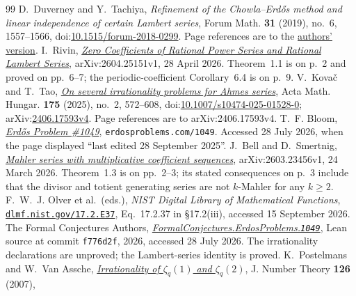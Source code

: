 \documentclass[11pt]{article}
\begin{document}
\begin{thebibliography}{99}
 D.~Duverney and Y.~Tachiya, \emph{Refinement of
  the Chowla--Erd\H{o}s method and linear independence of certain Lambert
  series}, Forum Math. \textbf{31} (2019), no.~6, 1557--1566,
  doi:\href{https://doi.org/10.1515/forum-2018-0299}{10.1515/forum-2018-0299}.
  Page references are to the
  \href{https://danielduverney.fr/documents/theorie-des-nombres/DuverneyTachiya190522.pdf}{authors'
  version}.
 I.~Rivin,
\href{https://arxiv.org/abs/2604.25151v1}{\emph{Zero Coefficients of Rational
  Power Series and Rational Lambert Series}}, arXiv:2604.25151v1,
  28 April 2026.
  Theorem~1.1 is on p.~2 and proved on pp.~6--7; the periodic-coefficient
  Corollary~6.4 is on p.~9.
 V.~Kova\v{c} and T.~Tao,
  \href{https://arxiv.org/abs/2406.17593v4}{\emph{On several irrationality
  problems for Ahmes series}}, Acta Math. Hungar. \textbf{175} (2025), no.~2,
  572--608,
  doi:\href{https://doi.org/10.1007/s10474-025-01528-0}{10.1007/s10474-025-01528-0};
  arXiv:\href{https://arxiv.org/abs/2406.17593v4}{2406.17593v4}.
  Page references are to arXiv:2406.17593v4.
 T.~F. Bloom,
  \href{https://www.erdosproblems.com/1049}{\emph{Erd\H{o}s Problem \#1049}},
  \texttt{erdosproblems.com/1049}. Accessed 28 July 2026, when the page
  displayed ``last edited 28 September 2025''.
 J.~Bell and D.~Smertnig,
  \href{https://arxiv.org/abs/2603.23456v1}{\emph{Mahler series with
  multiplicative coefficient sequences}}, arXiv:2603.23456v1,
  24 March 2026.  Theorem~1.3 is on pp.~2--3; its stated consequences on
  p.~3 include that the divisor and totient generating series are not
  $k$-Mahler for any $k\ge2$.
 F.~W.~J. Olver et al.\ (eds.), \emph{NIST Digital Library of
  Mathematical Functions},
  \href{https://dlmf.nist.gov/17.2.E37}{\texttt{dlmf.nist.gov/17.2.E37}},
  Eq.~17.2.37 in \S17.2(iii), accessed 15 September 2026.
 The Formal Conjectures Authors,
  \href{https://github.com/google-deepmind/formal-conjectures/blob/f776d2f2039351b00737ffcafb9d7d7666e1d9af/FormalConjectures/ErdosProblems/1049.lean}
  {\emph{FormalConjectures.ErdosProblems.\texttt{1049}}},
  Lean source at commit \texttt{f776d2f}, 2026, accessed 28 July 2026.  The
  irrationality declarations are unproved; the Lambert-series identity is
  proved.
 K.~Postelmans and W.~Van Assche,
  \href{https://arxiv.org/abs/math/0604312v1}{\emph{Irrationality of
  $\zeta_q(1)$ and $\zeta_q(2)$}}, J. Number Theory \textbf{126} (2007),

\end{thebibliography}
\end{document}
